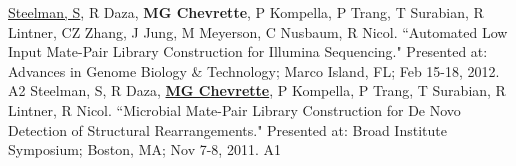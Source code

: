 \begin{cvpubs}
  \cvpub
    {\underline{Steelman, S}, R Daza, \textbf{MG Chevrette}, P Kompella, P Trang, T Surabian, R Lintner, CZ Zhang, J Jung, M Meyerson, C Nusbaum, R Nicol. ``Automated Low Input Mate-Pair Library Construction for Illumina Sequencing." Presented at: Advances in Genome Biology \& Technology; Marco Island, FL; Feb 15-18, 2012.} %
    {A2} %
  \cvpub
    {Steelman, S, R Daza, \underline{\textbf{MG Chevrette}}, P Kompella, P Trang, T Surabian, R Lintner, R Nicol. ``Microbial Mate-Pair Library Construction for De Novo Detection of Structural Rearrangements." Presented at: Broad Institute Symposium; Boston, MA; Nov 7-8, 2011.} %
    {A1} %
\end{cvpubs}
